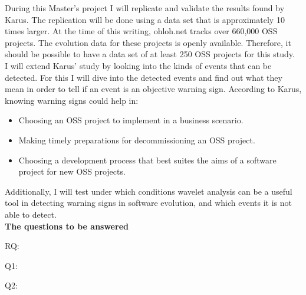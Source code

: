 During this Master's project I will replicate and validate the results found by
Karus. The replication will be done using a data set that is approximately 10 times
larger. At the time of this writing, ohloh.net tracks over 660,000 OSS projects.
The evolution data for these projects is openly available. Therefore, it should
be possible to have a data set of at least 250 OSS projects for this study.
\\

I will extend Karus' study by looking into the kinds of events that can be
detected. For this I will dive into the detected events and find out what they
mean in order to tell if an event is an objective warning sign. According to
Karus, knowing warning signs could help in:
\begin{itemize}
	\item Choosing an OSS project to implement in a business scenario.
	\item Making timely preparations for decommissioning an OSS project.
	\item Choosing a development process that best suites the aims of a software
	project for new OSS projects.
\end{itemize}

Additionally, I will test under which conditions wavelet analysis can be a
useful tool in detecting warning signs in software evolution, and which events
it is not able to detect.
\\

\noindent
\bfseries{The questions to be answered}\rm
\begin{description}
	\item[RQ:] \emph{\researchQuestion} \cite{karus2013}
	\item[Q1:] \emph{\subQuestionOne}
	\item[Q2:] \emph{\subQuestionTwo}
\end{description}
